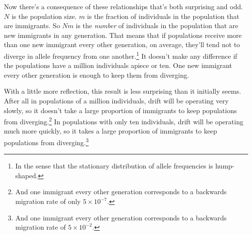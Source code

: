 \documentclass[12pt]{article}
\begin{document}
Now there's a consequence of these relationships that's both
surprising and odd. $N$ is the population size. $m$ is the fraction of
individuals in the population that are immigrants. So $Nm$ is the {\it
  number\/} of individuals in the population that are new immigrants
in any generation. That means that if populations receive more than
one new immigrant every other generation, on average, they'll tend not
to diverge in allele frequency from one another.\footnote{In the sense
  that the stationary distribution of allele frequencies is
  hump-shaped.} It doesn't make any difference if the populations have
a million individuals apiece or ten. One new immigrant every other
generation is enough to keep them from diverging.

With a little more reflection, this result is less surprising than it
initially seems. After all in populations of a million individuals,
drift will be operating very slowly, so it doesn't take a large
proportion of immigrants to keep populations from
diverging.\footnote{And one immigrant every other generation
  corresponds to a backwards migration rate of only $5\times
  10^{-7}$.} In populations with only ten individuals, drift will be
operating much more quickly, so it takes a large proportion of
immigrants to keep populations from diverging.\footnote{And one
  immigrant every other generation corresponds to a backwards
  migration rate of $5 \times 10^{-2}$.}

\ccLicense
\end{document}
